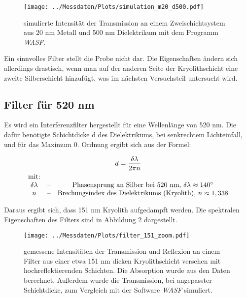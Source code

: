 \documentclass[10pt,twoside]{article}
\renewcommand{\1}{^{-1}}
\renewcommand{\2}{^{-2}}
\newcommand{\3}{^{-3}}
\newcommand{\4}{^{-4}}
\newcommand{\5}{^{-5}}
\newcommand{\6}{^{-6}}
\newcommand{\7}{^{-7}}
\newcommand{\8}{^{-8}}
\newcommand{\9}{^{-9}}
\begin{document}
\begin{figure}[H]
\centering
\texttt{[image: ../Messdaten/Plots/simulation\_m20\_d500.pdf]} 
\caption{simulierte Intensität der Transmission an einem Zweischichtsystem aus 20 nm Metall und 500 nm Dielektrikum mit dem Programm \textit{WASF}.}
\label{fig:md_500_sim}
\end{figure}

Ein sinnvolles Filter stellt die Probe nicht dar. Die Eigenschaften ändern sich allerdings drastisch, wenn man auf der anderen Seite der Kryolithschicht eine zweite Silberschicht hinzufügt, was im nächsten Versuchsteil untersucht wird.

\newpage

\subsection{Filter für 520 nm}

Es wird ein Interferenzfilter hergestellt für eine Wellenlänge von 520 nm.
Die dafür benötigte Schichtdicke d des Dielektrikums, bei senkrechtem Lichteinfall, und für das Maximum 0. Ordnung ergibt sich aus der Formel:

\begin{gather}
d = \frac{\delta \lambda}{2 \pi n}\\
\begin{matrix}
   \text{mit:} &&\\
   \delta \lambda & \text{--} & \text{Phasensprung an Silber bei 520 nm, }\delta \lambda \approx 140^\circ \\
   n & \text{--} & \text{Brechungsindex des Dielektrikums (Kryolith), } n \approx 1,338 \\
\end{matrix}\notag
\end{gather}

Daraus ergibt sich, dass 151 nm Kryolith aufgedampft werden.
Die spektralen Eigenschaften des Filters sind in Abbildung \ref{fig:mdm_151} dargestellt.

\begin{figure}[h]
\centering
\texttt{[image: ../Messdaten/Plots/filter\_151\_zoom.pdf]} 
\caption{gemessene Intensitäten der Transmission und Reflexion an einem Filter aus einer etwa 151 nm dicken Kryolithschicht versehen mit hochreflektierenden Schichten. Die Absorption wurde aus den Daten berechnet. Außerdem wurde die Transmission, bei angepasster Schichtdicke, zum Vergleich mit der Software \textit{WASF} simuliert.}
\label{fig:mdm_151}
\end{figure}
\end{document}

